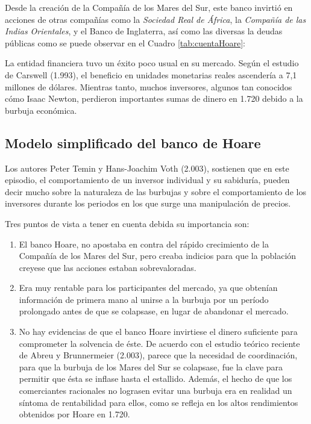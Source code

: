 Desde la creación de la Compañía de los Mares del Sur, este banco invirtió en acciones de otras compañías como la \emph{Sociedad Real de África}, la \emph{Compañía de las Indias Orientales}, y el Banco de Inglaterra, así como las diversas la deudas públicas como se puede observar en el Cuadro \ref{tab:cuentaHoare}:



La entidad financiera tuvo un éxito poco usual en su mercado. Según el estudio de Carswell (1.993), el beneficio en unidades monetarias reales ascendería a 7,1 millones de dólares. Mientras tanto, muchos inversores, algunos tan conocidos cómo Isaac Newton, perdieron importantes sumas de dinero en 1.720 debido a la burbuja económica. 

\subsection{Modelo simplificado del banco de Hoare}

Los autores Peter Temin y Hans-Joachim Voth (2.003), sostienen que en este episodio, el comportamiento de un inversor individual y su sabiduría, pueden decir mucho sobre la naturaleza de las burbujas y sobre el comportamiento de los inversores durante los periodos en los que surge una manipulación de precios. 

Tres puntos de vista a tener en cuenta debida su importancia son:

\begin{enumerate}
	\item El banco Hoare, no apostaba en contra del rápido crecimiento de la Compañía de los Mares del Sur, pero creaba indicios para que la población creyese que las acciones estaban sobrevaloradas.
	\item Era muy rentable para los participantes del mercado, ya que obtenían información de primera mano al unirse a la burbuja por un período prolongado antes de que se colapsase, en lugar de abandonar el mercado.
	\item No hay evidencias de que el banco Hoare invirtiese el dinero suficiente para comprometer la solvencia de éste. De acuerdo con el estudio teórico reciente de Abreu y Brunnermeier (2.003), parece que la necesidad de coordinación, para que la burbuja de los Mares del Sur se colapsase, fue la clave para permitir que ésta se inflase hasta el estallido. Además, el hecho de que los comerciantes racionales no lograsen evitar una burbuja era en realidad un síntoma de rentabilidad para ellos, como se refleja en los altos rendimientos obtenidos por Hoare en 1.720.
\end{enumerate}

